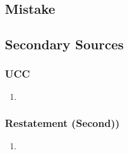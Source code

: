 \subsection{Mistake}


\subsection{Secondary Sources}

\subsubsection{UCC}

\begin{enumerate}
    \item %
\end{enumerate}

\subsubsection{Restatement (Second))}

\begin{enumerate}
    \item %
\end{enumerate}
